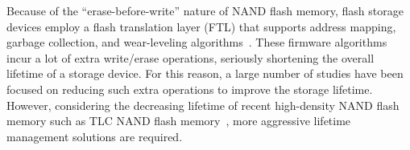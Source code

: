 

Because of the ``erase-before-write'' nature of NAND flash memory, 
flash storage devices employ a flash translation layer (FTL) 
that supports address mapping, garbage collection, and wear-leveling algorithms~\cite{FAST}. %
These firmware algorithms incur a lot of extra write/erase operations,
seriously shortening the overall lifetime of a storage device.
For this reason, a large number of studies have been focused on reducing such extra operations to improve the storage 
lifetime.
However, considering the decreasing lifetime of recent high-density NAND flash memory such as TLC NAND flash memory~\cite{tlc}, %
more aggressive lifetime management solutions are required. 

